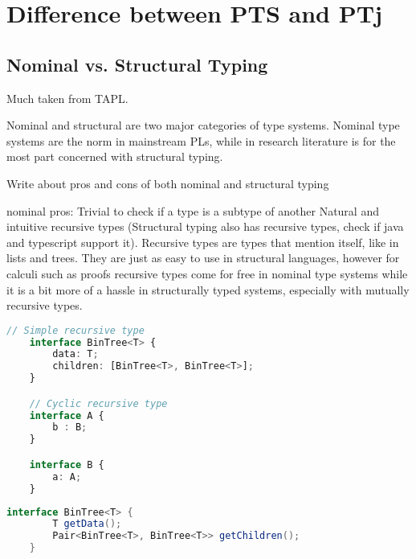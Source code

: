 
\chapter{Difference between PTS and PTj}\label{ch:difference-between-pts-and-ptj}


\section{Nominal vs. Structural Typing}\label{sec:nominal-vs-structural-typing}

Much taken from TAPL.

Nominal and structural are two major categories of type systems.
Nominal type systems are the norm in mainstream PLs, while in research literature is for the most part concerned with structural typing.

Write about pros and cons of both nominal and structural typing

nominal pros:
Trivial to check if a type is a subtype of another
Natural and intuitive recursive types (Structural typing also has recursive types, check if java and typescript support it).
    Recursive types are types that mention itself, like in lists and trees.
    They are just as easy to use in structural languages, however for calculi such as proofs recursive types come for free in nominal type systems while it is a bit more of a hassle in structurally typed systems, especially with mutually recursive types.

\begin{lstlisting}[label={lst:ts-recursive-type}, language=TypeScript]
    // Simple recursive type
    interface BinTree<T> {
        data: T;
        children: [BinTree<T>, BinTree<T>];
    }

    // Cyclic recursive type
    interface A {
        b : B;
    }

    interface B {
        a: A;
    }
\end{lstlisting}

\begin{lstlisting}[label={lst:java-recursive-type}, language=Java]
    interface BinTree<T> {
        T getData();
        Pair<BinTree<T>, BinTree<T>> getChildren();
    }
\end{lstlisting}

